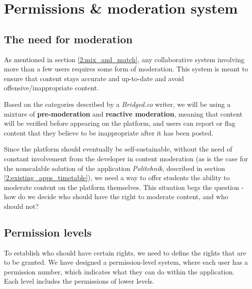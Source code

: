\section{Permissions \& moderation system} \label{4:permissions}

\subsection{The need for moderation} \label{4:permissions_need}

As mentioned in section \ref{2:mix_and_match}, any collaborative system involving more than a few users requires some form of moderation\cite{roberts2019behind}. This system is meant to ensure that content stays accurate and up-to-date and avoid offensive/inappropriate content.

Based on the categories described by a \textit{Bridged.co} writer\cite{bridged2019moderation}, we will be using a mixture of \textbf{pre-moderation} and \textbf{reactive moderation}, meaning that content will be verified before appearing on the platform, and users can report or flag content that they believe to be inappropriate after it has been posted.

Since the platform should eventually be self-sustainable, without the need of constant involvement from the developer in content moderation (as is the case for the nonscalable solution of the application \textit{Politehnik}, described in section \ref{2:existing_apps_timetable}), we need a way to offer students the ability to moderate content on the platform themselves. This situation begs the question - how do we decide who should have the right to moderate content, and who should not?

\subsection{Permission levels} \label{4:permissions_levels}

To establish who should have certain rights, we need to define the rights that are to be granted. We have designed a permission-level system, where each user has a permission number, which indicates what they can do within the application. Each level includes the permissions of lower levels.

